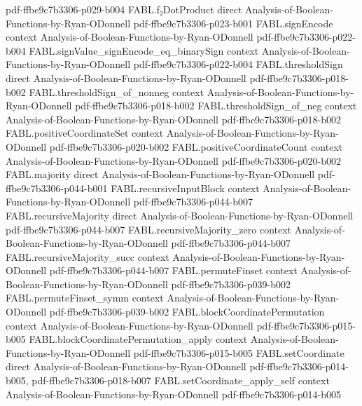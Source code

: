 \begin{theorem}
  {pdf-ffbe9c7b3306-p029-b004}
\proofstep
  {FABL.f₂DotProduct}
  {direct}
  {Analysis-of-Boolean-Functions-by-Ryan-ODonnell}
  {pdf-ffbe9c7b3306-p023-b001}
\proofstep
  {FABL.signEncode}
  {context}
  {Analysis-of-Boolean-Functions-by-Ryan-ODonnell}
  {pdf-ffbe9c7b3306-p022-b004}
\proofstep
  {FABL.signValue_signEncode_eq_binarySign}
  {context}
  {Analysis-of-Boolean-Functions-by-Ryan-ODonnell}
  {pdf-ffbe9c7b3306-p022-b004}
\proofstep
  {FABL.thresholdSign}
  {direct}
  {Analysis-of-Boolean-Functions-by-Ryan-ODonnell}
  {pdf-ffbe9c7b3306-p018-b002}
\proofstep
  {FABL.thresholdSign_of_nonneg}
  {context}
  {Analysis-of-Boolean-Functions-by-Ryan-ODonnell}
  {pdf-ffbe9c7b3306-p018-b002}
\proofstep
  {FABL.thresholdSign_of_neg}
  {context}
  {Analysis-of-Boolean-Functions-by-Ryan-ODonnell}
  {pdf-ffbe9c7b3306-p018-b002}
\proofstep
  {FABL.positiveCoordinateSet}
  {context}
  {Analysis-of-Boolean-Functions-by-Ryan-ODonnell}
  {pdf-ffbe9c7b3306-p020-b002}
\proofstep
  {FABL.positiveCoordinateCount}
  {context}
  {Analysis-of-Boolean-Functions-by-Ryan-ODonnell}
  {pdf-ffbe9c7b3306-p020-b002}
\proofstep
  {FABL.majority}
  {direct}
  {Analysis-of-Boolean-Functions-by-Ryan-ODonnell}
  {pdf-ffbe9c7b3306-p044-b001}
\proofstep
  {FABL.recursiveInputBlock}
  {context}
  {Analysis-of-Boolean-Functions-by-Ryan-ODonnell}
  {pdf-ffbe9c7b3306-p044-b007}
\proofstep
  {FABL.recursiveMajority}
  {direct}
  {Analysis-of-Boolean-Functions-by-Ryan-ODonnell}
  {pdf-ffbe9c7b3306-p044-b007}
\proofstep
  {FABL.recursiveMajority_zero}
  {context}
  {Analysis-of-Boolean-Functions-by-Ryan-ODonnell}
  {pdf-ffbe9c7b3306-p044-b007}
\proofstep
  {FABL.recursiveMajority_succ}
  {context}
  {Analysis-of-Boolean-Functions-by-Ryan-ODonnell}
  {pdf-ffbe9c7b3306-p044-b007}
\proofstep
  {FABL.permuteFinset}
  {context}
  {Analysis-of-Boolean-Functions-by-Ryan-ODonnell}
  {pdf-ffbe9c7b3306-p039-b002}
\proofstep
  {FABL.permuteFinset_symm}
  {context}
  {Analysis-of-Boolean-Functions-by-Ryan-ODonnell}
  {pdf-ffbe9c7b3306-p039-b002}
\proofstep
  {FABL.blockCoordinatePermutation}
  {context}
  {Analysis-of-Boolean-Functions-by-Ryan-ODonnell}
  {pdf-ffbe9c7b3306-p015-b005}
\proofstep
  {FABL.blockCoordinatePermutation_apply}
  {context}
  {Analysis-of-Boolean-Functions-by-Ryan-ODonnell}
  {pdf-ffbe9c7b3306-p015-b005}
\proofstep
  {FABL.setCoordinate}
  {direct}
  {Analysis-of-Boolean-Functions-by-Ryan-ODonnell}
  {pdf-ffbe9c7b3306-p014-b005,
    pdf-ffbe9c7b3306-p018-b007}
\proofstep
  {FABL.setCoordinate_apply_self}
  {context}
  {Analysis-of-Boolean-Functions-by-Ryan-ODonnell}
  {pdf-ffbe9c7b3306-p014-b005}

\end{theorem}
